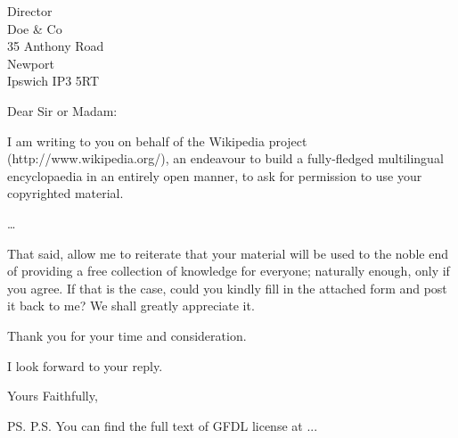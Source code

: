 \documentclass{letter}
\begin{document}
\begin{letter}{Director \\ Doe \& Co \\ 35 Anthony Road
\\ Newport \\ Ipswich IP3 5RT}
\opening{Dear Sir or Madam:}

I am writing to you on behalf of the Wikipedia project (http://www.wikipedia.org/),
an endeavour to build a fully-fledged multilingual encyclopaedia in an entirely
open manner, to ask for permission to use your copyrighted material.

\ldots

That said, allow me to reiterate that your material will be used to the noble end of
providing a free collection of knowledge for everyone; naturally enough, only if you
agree. If that is the case, could you kindly fill in the attached form and post it
back to me? We shall greatly appreciate it.

Thank you for your time and consideration.

I look forward to your reply.

\closing{Yours Faithfully,}

\ps{P.S. You can find the full text of GFDL license at ...}

\end{letter}
\end{document}
